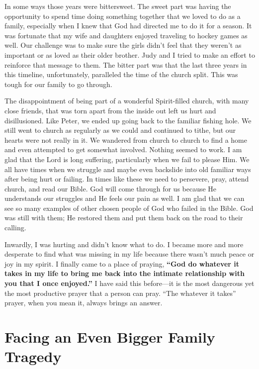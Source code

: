 \documentclass[twoside, 12pt]{book}
\begin{document}
In some ways those years were bittersweet. The sweet part was having the opportunity to spend time doing something together that we loved to do as a family, especially when I knew that God had directed me to do it for a season. It was fortunate that my wife and daughters enjoyed traveling to hockey games as well. Our challenge was to make sure the girls didn't feel that they weren't as important or as loved as their older brother. Judy and I tried to make an effort to reinforce that message to them. The bitter part was that the last three years in this timeline, unfortunately, paralleled the time of the church split. This was tough for our family to go through.

The disappointment of being part of a wonderful Spirit-filled church, with many close friends, that was torn apart from the inside out left us hurt and disillusioned. Like Peter, we ended up going back to the familiar fishing hole. We still went to church as regularly as we could and continued to tithe, but our hearts were not really in it. We wandered from church to church to find a home and even attempted to get somewhat involved. Nothing seemed to work. I am glad that the Lord is long suffering, particularly when we fail to please Him. We all have times when we struggle and maybe even backslide into old familiar ways after being hurt or failing. In times like these we need to persevere, pray, attend church, and read our Bible. God will come through for us because He understands our struggles and He feels our pain as well. I am glad that we can see so many examples of other chosen people of God who failed in the Bible. God was still with them; He restored them and put them back on the road to their calling.

Inwardly, I was hurting and didn't know what to do. I became more and more desperate to find what was missing in my life because there wasn't much peace or joy in my spirit. I finally came to a place of praying, \textbf{“God do whatever it takes in my life to bring me back into the intimate relationship with you that I once enjoyed.”} I have said this before—it is the most dangerous yet the most productive prayer that a person can pray. “The whatever it takes” prayer, when you mean it, always brings an answer.


\section{Facing an Even Bigger Family Tragedy}
\
\end{document}
